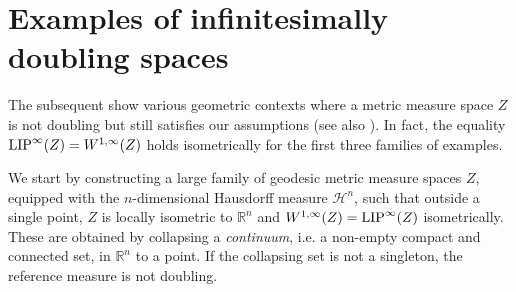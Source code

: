 \documentclass[reqno]{amsart}
\newcommand{\LIP}{{\rm LIP}}
\numberwithin{equation}{section}
\theoremstyle{remark}
\begin{document}
\section{Examples of infinitesimally doubling spaces}\label{sec:examples}

The subsequent  show various geometric contexts where a metric measure space $Z$ is not doubling but still satisfies our assumptions (see also ). In fact, the equality $\LIP^\infty(Z)=W^{1,\infty}(Z)$ holds isometrically for the first three families of examples.
 
  
  We start by constructing a large family of geodesic metric measure spaces $Z$, equipped with the $n$-dimensional Hausdorff measure $\mathcal{H}^n$, such that outside a single point, $Z$ is locally isometric to $\mathbb{R}^n$ and $W^{1,\infty}(Z) = \LIP^{\infty}(Z)$ isometrically. These are obtained by collapsing a \emph{continuum}, i.e. a non-empty compact and connected set, in $\mathbb{R}^n$ to a point. If the collapsing set is not a singleton, the reference measure is not doubling.
\end{document}
